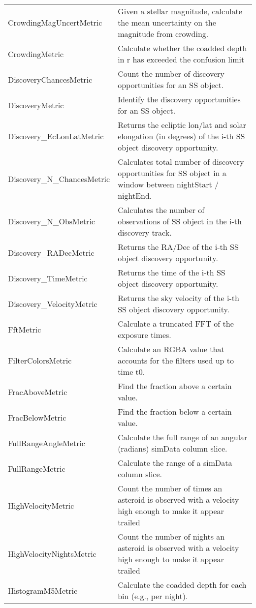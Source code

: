 \begin{table}
\begin{tabular}{ll}
 CrowdingMagUncertMetric &  Given a stellar magnitude, calculate the mean uncertainty on the magnitude from crowding. \\
 CrowdingMetric &  Calculate whether the coadded depth in r has exceeded the confusion limit \\
 DiscoveryChancesMetric &  Count the number of discovery opportunities for an SS object. \\
 DiscoveryMetric &  Identify the discovery opportunities for an SS object. \\
 Discovery\_EcLonLatMetric &  Returns the ecliptic lon/lat and solar elongation (in degrees) of the i-th SS object discovery opportunity. \\
 Discovery\_N\_ChancesMetric &  Calculates total number of discovery opportunities for SS object in a window between nightStart / nightEnd. \\
 Discovery\_N\_ObsMetric &  Calculates the number of observations of SS object in the i-th discovery track. \\
 Discovery\_RADecMetric &  Returns the RA/Dec of the i-th SS object discovery opportunity. \\
 Discovery\_TimeMetric &  Returns the time of the i-th SS object discovery opportunity. \\
 Discovery\_VelocityMetric &  Returns the sky velocity of the i-th SS object discovery opportunity. \\
 FftMetric &  Calculate a truncated FFT of the exposure times. \\
 FilterColorsMetric &  Calculate an RGBA value that accounts for the filters used up to time t0. \\
 FracAboveMetric &  Find the fraction above a certain value. \\
 FracBelowMetric &  Find the fraction below a certain value. \\
 FullRangeAngleMetric &  Calculate the full range of an angular (radians) simData column slice. \\
 FullRangeMetric &  Calculate the range of a simData column slice. \\
 HighVelocityMetric &  Count the number of times an asteroid is observed with a velocity high enough to make it appear trailed \\
 HighVelocityNightsMetric &  Count the number of nights an asteroid is observed with a velocity high enough to make it appear trailed \\
 HistogramM5Metric &  Calculate the coadded depth for each bin (e.g., per night). \\

\end{tabular}
\end{table}
